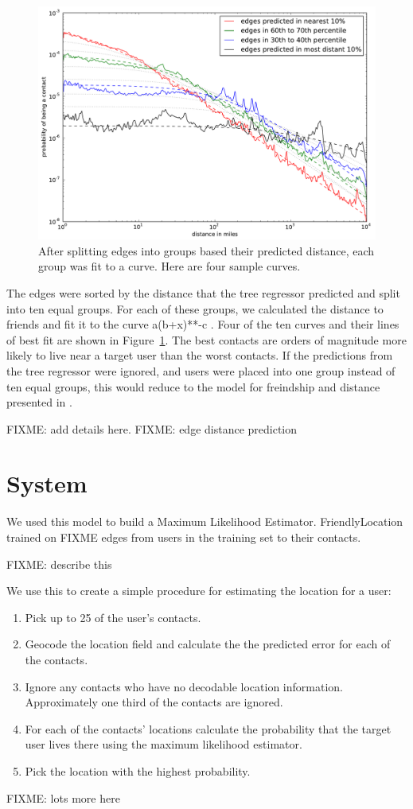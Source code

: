 \begin{figure}[tb]
\centering
\includegraphics[width=\linewidth]{figures/near_prob_fit.pdf}
\caption{
After splitting edges into groups based their predicted distance, each group was fit to a curve. Here are four sample curves.
}
\label{fig:NearProbFit}
\end{figure}


The edges were sorted by the distance that the tree regressor predicted and
split into ten equal groups.
%
For each of these groups, we calculated the distance to friends and fit it to
the curve a(b+x)**-c .
%
Four of the ten curves and their lines of best fit are shown in
Figure~\ref{fig:NearProbFit}. The best contacts are orders of magnitude more
likely to live near a target user than the worst contacts.
%
If the predictions from the tree regressor were ignored, and users were placed
into one group instead of ten equal groups, this would reduce to the model
for freindship and distance presented in \cite{backstrom2010find}.

FIXME: add details here.
FIXME: edge distance prediction

\section{System}
We used this model to build a Maximum Likelihood Estimator.
FriendlyLocation trained on FIXME edges from users in the training set to
their contacts.

FIXME: describe this

We use this to create a simple procedure for estimating the location for a user:
\begin{enumerate}
\item Pick up to 25 of the user's contacts.
\item Geocode the location field and calculate the the predicted error for each
of the contacts.
\item Ignore any contacts who have no decodable location information.
Approximately one third of the contacts are ignored.
\item For each of the contacts' locations calculate the probability that the
target user lives there using the maximum likelihood estimator.
\item Pick the location with the highest probability.
\end{enumerate}

FIXME: lots more here

